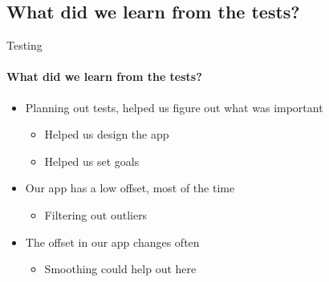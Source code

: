     \subsection{What did we learn from the tests?}
        \begin{frame}{Testing}\framesubtitle{What did we learn from the tests?}
            \begin{itemize}
                \item Planning out tests, helped us figure out what was important
                \begin{itemize}
                    \item Helped us design the app
                    \item Helped us set goals
                \end{itemize}
                \bigskip
                \item Our app has a low offset, most of the time
                \begin{itemize}
                    \item Filtering out outliers
                \end{itemize}
                \item The offset in our app changes often
                \begin{itemize}
                    \item Smoothing could help out here
                \end{itemize}

            \end{itemize}
        \end{frame}
